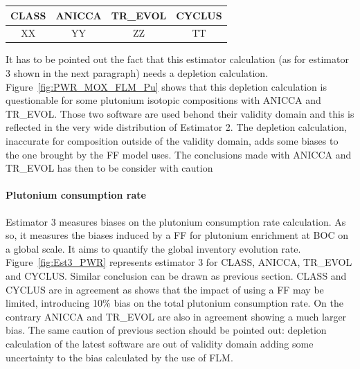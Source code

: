 \begin{table}[h]
	\begin{center}
		\begin{tabular}{|c||c||c||c|}
			\hline 
				CLASS & ANICCA & TR\_EVOL & CYCLUS \\
			\hline
				XX & YY & ZZ & TT \\
		\end{tabular}
	\end{center}
	\label{table:Est2_PWR}
\end{table}

It has to be pointed out the fact that this estimator calculation (as for estimator 3 shown in the next paragraph) needs a depletion calculation. Figure~\ref{fig:PWR_MOX_FLM_Pu} shows that this depletion calculation is questionable for some plutonium isotopic compositions with ANICCA and TR\_EVOL. Those two software are used behond their validity domain and this is reflected in the very wide distribution of Estimator 2. The depletion calculation, inaccurate for composition outside of the validity domain, adds some biases to the one brought by the FF model uses. The conclusions made with ANICCA and TR\_EVOL has then to be consider with caution

\paragraph{Plutonium consumption rate}
Estimator 3 measures biases on the plutonium consumption rate calculation. As so, it measures the biases induced by a FF for plutonium enrichment at BOC on a global scale. It aims to quantify the global inventory evolution rate. 
Figure~\ref{fig:Est3_PWR} represents estimator 3 for CLASS, ANICCA, TR\_EVOL and CYCLUS. Similar conclusion can be drawn as previous section. CLASS and CYCLUS are in agreement as shows that the impact of using a FF may be limited, introducing 10\% bias on the total plutonium consumption rate. On the contrary ANICCA and TR\_EVOL are also in agreement showing a much larger bias. The same caution of previous section should be pointed out: depletion calculation of the latest software are out of validity domain adding some uncertainty to the bias calculated by the use of FLM.       

